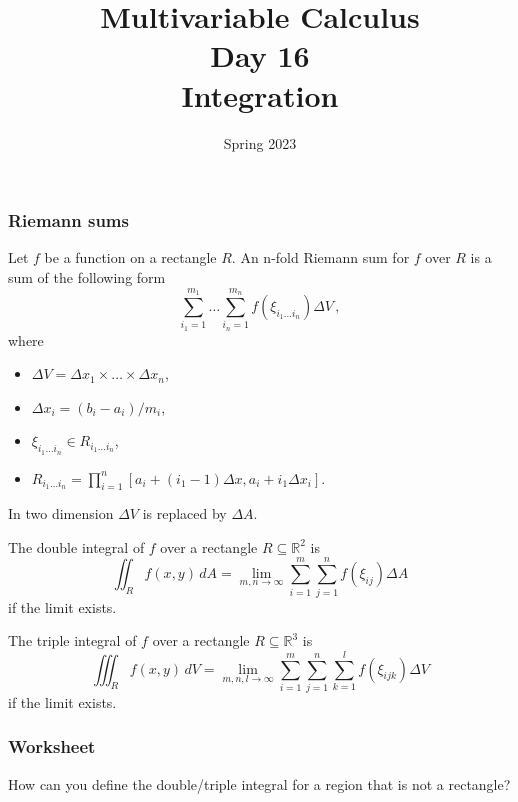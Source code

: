 \documentclass[aspectratio=169]{beamer}
\title{ Multivariable Calculus \\ Day  16\\ Integration }
\date{Spring 2023}
\begin{document}
\maketitle

\begin{frame}
    \frametitle{Riemann sums}
Let \(f\) be a function on a rectangle \(R\).
An n-fold Riemann sum for \(f\) over \(R\) is a sum of the following form
\begin{equation*}
 \sum_{i_1=1}^{m_1}\dots \sum_{i_n=1}^{m_n} f(\xi_{i_1\dots i_n}) \Delta V \,,
\end{equation*}
where

\begin{itemize}
\item
  \(\Delta V = \Delta x_1\times\dots \times \Delta x_n\),
\item
  \(\Delta x_i = (b_i-a_i)/m_i\),
\item
  \(\xi_{i_1\dots i_n}\in R_{i_1\dots i_n}\),
\item
    \(R_{i_1\dots i_n}= \prod_{i=1}^n [a_i + (i_1-1)\Delta x, a_i+ i_1\Delta x_i]\).
\end{itemize}
In two dimension $\Delta V$ is replaced by $\Delta A$.
\end{frame}


\begin{frame}
    \begin{definition}
    The double integral of \(f\) over a rectangle \(R \subseteq \mathbb{R}^2\) is
    \begin{equation*}
        \iint_{R} f(x,y) \, dA = \lim_{m,n\to \infty} \sum_{i=1}^m \sum_{j=1}^n f(\xi_{ij}) \Delta A 
    \end{equation*}
    if the limit exists.

    The triple integral of \(f\) over a rectangle \(R \subseteq \mathbb{R}^3\) is
    \begin{equation*}
        \iiint_{R} f(x,y) \, dV = \lim_{m,n,l\to \infty} \sum_{i=1}^m \sum_{j=1}^n \sum_{k=1}^l f(\xi_{ijk}) \Delta V
    \end{equation*}
    if the limit exists.
    \end{definition}
\end{frame}

\begin{frame}
    \frametitle{Worksheet}
    How can you define the double/triple integral for a region that is not a rectangle?
\end{frame}
\end{document}
